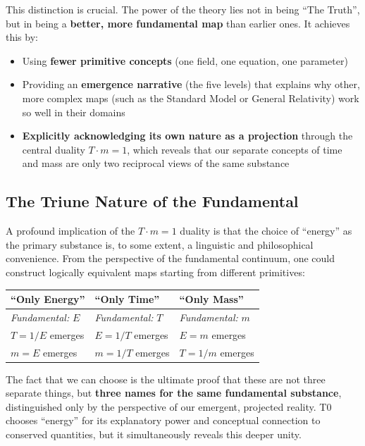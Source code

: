 	This distinction is crucial. The power of the theory lies not in being \enquote{The Truth}, but in being a \textbf{better, more fundamental map} than earlier ones. It achieves this by:
	\begin{itemize}
		\item Using \textbf{fewer primitive concepts} (one field, one equation, one parameter)
		\item Providing an \textbf{emergence narrative} (the five levels) that explains why other, more complex maps (such as the Standard Model or General Relativity) work so well in their domains
		\item \textbf{Explicitly acknowledging its own nature as a projection} through the central duality $T \cdot m = 1$, which reveals that our separate concepts of time and mass are only two reciprocal views of the same substance
	\end{itemize}
	
	\subsection{The Triune Nature of the Fundamental}
	
	A profound implication of the $T \cdot m = 1$ duality is that the choice of \enquote{energy} as the primary substance is, to some extent, a linguistic and philosophical convenience. From the perspective of the fundamental continuum, one could construct logically equivalent maps starting from different primitives:
	
	\begin{center}
		\begin{tabular}{p{} p{} p{}}
			\toprule
			\textbf{\enquote{Only Energy}} & \textbf{\enquote{Only Time}} & \textbf{\enquote{Only Mass}} \\
			\midrule
			\textit{Fundamental: } $E$ & \textit{Fundamental: } $T$ & \textit{Fundamental: } $m$ \\
			$T = 1/E$ emerges & $E = 1/T$ emerges & $E = m$ emerges \\
			$m = E$ emerges & $m = 1/T$ emerges & $T = 1/m$ emerges \\
			\bottomrule
		\end{tabular}
	\end{center}
	
	The fact that we can choose is the ultimate proof that these are not three separate things, but \textbf{three names for the same fundamental substance}, distinguished only by the perspective of our emergent, projected reality. T0 chooses \enquote{energy} for its explanatory power and conceptual connection to conserved quantities, but it simultaneously reveals this deeper unity.
	
